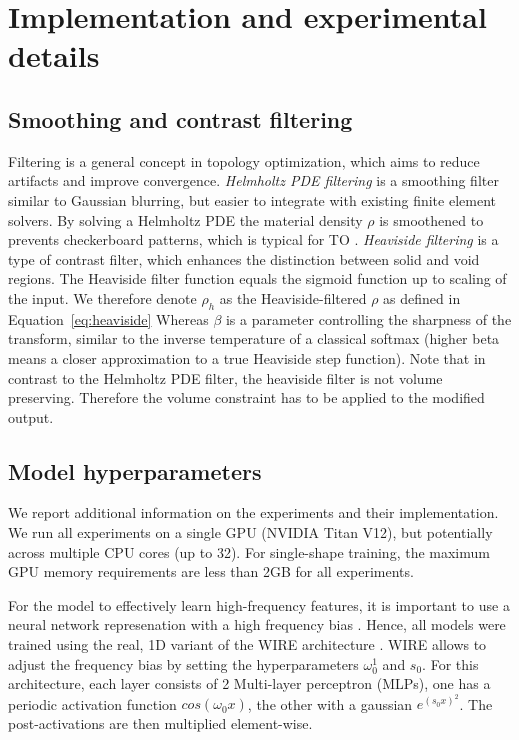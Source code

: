 \newpage



\section{Implementation and experimental details}
\label{app:exp_details}

\subsection{Smoothing and contrast filtering}
\label{subsec:density_filters}
Filtering is a general concept in topology optimization, which aims to reduce artifacts and improve convergence.
\emph{Helmholtz PDE filtering} is a smoothing filter similar to Gaussian blurring, but easier to integrate with existing finite element solvers. %
By solving a Helmholtz PDE the material density $\rho$ is smoothened to prevents checkerboard patterns, which is typical for TO \citep{lazarov2011filters}.
\emph{Heaviside filtering} is a type of contrast filter, which enhances the distinction between solid and void regions.
The Heaviside filter function equals the sigmoid function up to scaling of the input. We therefore denote $\rho_h$ as the Heaviside-filtered $\rho$ as defined in Equation~\ref{eq:heaviside} Whereas $\beta$ is a parameter controlling the sharpness of the transform, similar to the inverse temperature of a classical softmax (higher beta means a closer approximation to a true Heaviside step function).
Note that in contrast to the Helmholtz PDE filter, the heaviside filter is not volume preserving. Therefore the volume constraint has to be applied to the modified output.





\subsection{Model hyperparameters}

We report additional information on the experiments and their implementation.
We run all experiments on a single GPU (NVIDIA Titan V12), but potentially across multiple CPU cores (up to 32).
For single-shape training, the maximum GPU memory requirements are less than 2GB for all experiments.

For the model to effectively learn high-frequency features, it is important to use a neural network represenation with a high frequency bias \citep{sitzmann2019siren,Teney2024NeuralRR}.
Hence, all models were trained using the real, 1D variant of the WIRE architecture \citep{saragadam2023wire}.
WIRE allows to adjust the frequency bias by setting the hyperparameters $\omega_0^1$ and $s_0$.
For this architecture, each layer consists of 2 Multi-layer perceptron (MLPs), one has a periodic activation function $cos(\omega_0 x)$, the other with a gaussian $e^{(s_0 x)^2}$. 
The post-activations are then multiplied element-wise.



